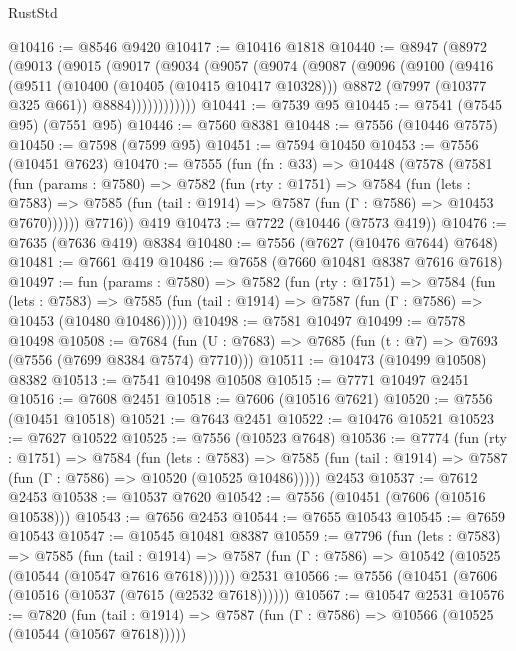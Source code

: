 \begin{lexlean}{RustStd}
\begin{coremodule}
@10416 := @8546 @9420
@10417 := @10416 @1818
@10440 := @8947
    (@8972
      (@9013
        (@9015
          (@9017
            (@9034
              (@9057
                (@9074
                  (@9087
                    (@9096
                      (@9100
                        (@9416
                          (@9511
                            (@10400 (@10405 (@10415 @10417 @10328)))
                            @8872
                            (@7997 (@10377 @325 @661))
                            @8884))))))))))))
@10441 := @7539 @95
@10445 := @7541 (@7545 @95) (@7551 @95)
@10446 := @7560 @8381
@10448 := @7556 (@10446 @7575)
@10450 := @7598 (@7599 @95)
@10451 := @7594 @10450
@10453 := @7556 (@10451 @7623)
@10470 := @7555
    (fun (fn : @33) =>
    @10448
      (@7578
        (@7581
          (fun (params : @7580) =>
          @7582
            (fun (rty : @1751) =>
            @7584
              (fun (lets : @7583) =>
              @7585 (fun (tail : @1914) => @7587 (fun (Γ : @7586) => @10453 @7670))))))
        @7716))
    @419
@10473 := @7722 (@10446 (@7573 @419))
@10476 := @7635 (@7636 @419) @8384
@10480 := @7556 (@7627 (@10476 @7644) @7648)
@10481 := @7661 @419
@10486 := @7658 (@7660 @10481 @8387 @7616 @7618)
@10497 := fun (params : @7580) =>
  @7582
    (fun (rty : @1751) =>
    @7584
      (fun (lets : @7583) =>
      @7585 (fun (tail : @1914) => @7587 (fun (Γ : @7586) => @10453 (@10480 @10486)))))
@10498 := @7581 @10497
@10499 := @7578 @10498
@10508 := @7684 (fun (U : @7683) => @7685 (fun (t : @7) => @7693 (@7556 (@7699 @8384 @7574) @7710)))
@10511 := @10473 (@10499 @10508) @8382
@10513 := @7541 @10498 @10508
@10515 := @7771 @10497 @2451
@10516 := @7608 @2451
@10518 := @7606 (@10516 @7621)
@10520 := @7556 (@10451 @10518)
@10521 := @7643 @2451
@10522 := @10476 @10521
@10523 := @7627 @10522
@10525 := @7556 (@10523 @7648)
@10536 := @7774
    (fun (rty : @1751) =>
    @7584
      (fun (lets : @7583) =>
      @7585 (fun (tail : @1914) => @7587 (fun (Γ : @7586) => @10520 (@10525 @10486)))))
    @2453
@10537 := @7612 @2453
@10538 := @10537 @7620
@10542 := @7556 (@10451 (@7606 (@10516 @10538)))
@10543 := @7656 @2453
@10544 := @7655 @10543
@10545 := @7659 @10543
@10547 := @10545 @10481 @8387
@10559 := @7796
    (fun (lets : @7583) =>
    @7585
      (fun (tail : @1914) =>
      @7587 (fun (Γ : @7586) => @10542 (@10525 (@10544 (@10547 @7616 @7618))))))
    @2531
@10566 := @7556 (@10451 (@7606 (@10516 (@10537 (@7615 (@2532 @7618))))))
@10567 := @10547 @2531
@10576 := @7820
    (fun (tail : @1914) => @7587 (fun (Γ : @7586) => @10566 (@10525 (@10544 (@10567 @7618)))))

\end{coremodule}
\end{lexlean}
